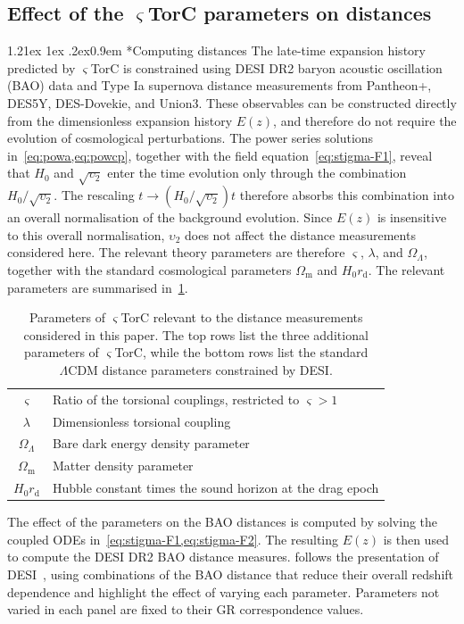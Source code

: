 \documentclass[aps,prd,reprint,preprintnumbers,showpacs,floatfix,nofootinbib,superscriptaddress]{revtex4-2}
\makeatletter
\renewcommand{\paragraph}{%
\@startsection{paragraph}{4}%
{\z@}{1.21ex \@plus 1ex \@minus .2ex}{0.9em}%
{\normalfont\normalsize\bfseries}%
}
\newcommand{\LCDM}{\ensuremath{\Lambda\mathrm{CDM}}}
\newcommand{\Om}{\Omega_\mathrm{m}}
\newcommand{\OL}{\Omega_\Lambda}
\newcommand{\CLAUD}[1]{\ifmmode\text{#1}\else#1\fi}
\makeatother
\begin{document}
\subsection{Effect of the $\varsigma$TorC parameters on distances}
\label{sec:stigma-effects}
\paragraph*{Computing distances} The late-time expansion history predicted by $\varsigma$TorC is constrained using DESI DR2 baryon acoustic oscillation (BAO) data and Type Ia supernova distance measurements from Pantheon+, DES5Y, \CLAUD{DES-Dovekie,} and Union3. These observables can be constructed directly from the dimensionless expansion history $E(z)$, and therefore do not require the evolution of cosmological perturbations. The power series solutions in~\cref{eq:powa,eq:powcp}, together with the field equation~\cref{eq:stigma-F1}, reveal that $H_0$ and $\sqrt{\upsilon_2}$ enter the time evolution only through the combination $H_0/\sqrt{\upsilon_2}$. The rescaling $t\rightarrow (H_0/\sqrt{\upsilon_2})t$ therefore absorbs this combination into an overall normalisation of the background evolution. Since $E(z)$ is insensitive to this overall normalisation, $\upsilon_2$ does not affect the distance measurements considered here. The relevant theory parameters are therefore $\varsigma$, $\lambda$, and $\Omega_\Lambda$, together with the standard cosmological parameters $\Omega_\mathrm{m}$ and $H_0r_\mathrm{d}$. The relevant parameters are summarised in~\cref{tab:stigma-params}.
\begin{table}[t]
\centering
\begin{tabularx}{\columnwidth}{c|>{\raggedright\arraybackslash}X}
\toprule
$\varsigma$ & Ratio of the torsional couplings, restricted to $\varsigma>1$\\
$\lambda$ & Dimensionless torsional coupling\\
$\OL$ & Bare dark energy density parameter\\
\midrule
$\Om$ & Matter density parameter\\
$H_0 r_\mathrm{d}$ & Hubble constant times the sound horizon at the drag epoch\\
\bottomrule
\end{tabularx}
\caption{Parameters of $\varsigma$TorC relevant to the distance measurements considered in this paper. The top rows list the three additional parameters of $\varsigma$TorC, while the bottom rows list the standard \LCDM{} distance parameters constrained by DESI.}
\label{tab:stigma-params}
\end{table}
The effect of the parameters on the BAO distances is computed by solving the coupled ODEs in~\cref{eq:stigma-F1,eq:stigma-F2}. The resulting $E(z)$ is then used to compute the DESI DR2 BAO distance measures.  follows the presentation of DESI~\citep{DESI:2024mwx}, using combinations of the BAO distance that reduce their overall redshift dependence and highlight the effect of varying each parameter. Parameters not varied in each panel are fixed to their GR correspondence values.
\end{document}
